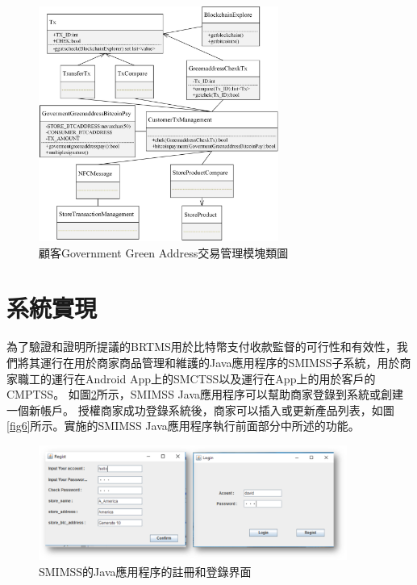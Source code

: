 	\begin{figure}[!htbp]
		\centering
		\includegraphics[width = 0.7\textwidth]{c6.jpg}
		\caption{顧客Government Green Address交易管理模塊類圖}\label{c6}
	\end{figure}

\section{系統實現}


為了驗證和證明所提議的BRTMS用於比特幣支付收款監督的可行性和有效性，我們將其運行在用於商家商品管理和維護的Java應用程序的SMIMSS子系統，用於商家職工的運行在Android App上的SMCTSS以及運行在App上的用於客戶的CMPTSS。
如圖\ref{fig5}所示，SMIMSS Java應用程序可以幫助商家登錄到系統或創建一個新帳戶。 授權商家成功登錄系統後，商家可以插入或更新產品列表，如圖\ref{fig6}所示。實施的SMIMSS Java應用程序執行前面部分中所述的功能。

\begin{figure}[!htbp]
	\centering
	\includegraphics[width = 0.9\textwidth]{fig5.png}
	\caption{SMIMSS的Java應用程序的註冊和登錄界面}\label{fig5}
\end{figure}

